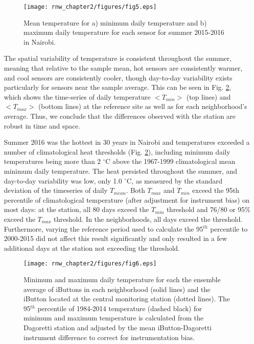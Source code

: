 \begin{figure}
\centering
\texttt{[image: rnw\_chapter2/figures/fig5.eps]}
\caption{%
Mean temperature for a) minimum daily temperature and b) maximum daily temperature for each sensor for summer 2015-2016 in Nairobi. }
\label{temp}
\end{figure}

The spatial variability of temperature is consistent throughout the summer, meaning that relative to the sample mean, hot sensors are consistently warmer, and cool sensors are consistently cooler, though day-to-day variability exists particularly for sensors near the sample average. This can be seen in Fig. \ref{timeseries}, which shows the time-series of daily temperature $<T_{min}>$ (top lines) and $<T_{max}>$ (bottom lines) at the reference site as well as for each neighborhood's average.
Thus, we conclude that the differences observed with the station are robust in time and space. 

Summer 2016 was the hottest in 30 years in Nairobi and temperatures exceeded a number of climatological heat thresholds (Fig. \ref{timeseries}), including minimum daily temperatures being more than 2 $^\circ$C above the 1967-1999 climatological mean minimum daily temperature. The heat persisted throughout the summer, and day-to-day variability was low, only 1.0 $^\circ $C, as measured by the standard deviation of the timeseries of daily $T_{mean}$.  Both $T_{max}$ and $T_{min}$ exceed the 95th percentile of climatological temperature (after adjustment for instrument bias) on most days: at the station, all 80 days exceed the $T_{min}$ threshold and 76/80 or 95\% exceed the $T_{max}$ threshold. In the neighborhoods, all days exceed the threshold. Furthermore, varying the reference period used to calculate the 95$^{th}$ percentile to 2000-2015 did not affect this result significantly and only resulted in a few additional days at the station not exceeding the threshold. 

\begin{figure}
\texttt{[image: rnw\_chapter2/figures/fig6.eps]}
\caption{%
Minimum and maximum daily temperature for each the ensemble average of iButtons in each neighborhood (solid lines) and the iButton located at the central monitoring station (dotted lines). The 95$^{th}$ percentile of 1984-2014 temperature (dashed black) for minimum and maximum temperature is calculated from the Dagoretti station and adjusted by the mean iButton-Dagoretti instrument difference to correct for instrumentation bias.} 
\label{timeseries}
\end{figure}

